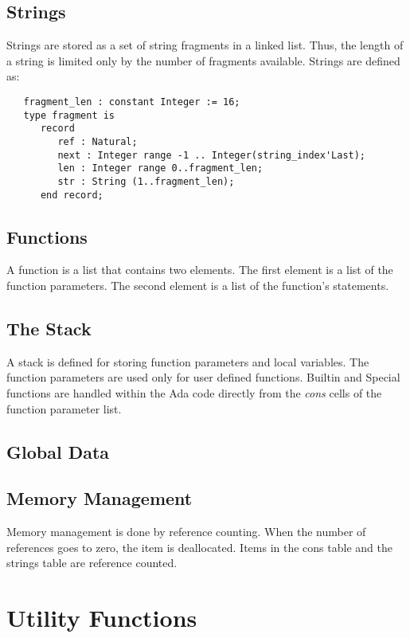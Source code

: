 \documentclass[10pt, openany]{book}
\begin{document}
\subsection{Strings}
\label{sec:strings}
Strings are stored as a set of string fragments in a linked list.  Thus, the length of a string is limited only by the number of fragments available.  Strings are defined as:
\begin{lstlisting}
   fragment_len : constant Integer := 16;
   type fragment is
      record
         ref : Natural;
         next : Integer range -1 .. Integer(string_index'Last);
         len : Integer range 0..fragment_len;
         str : String (1..fragment_len);
      end record;
\end{lstlisting}

\subsection{Functions}
\label{sec:Functions}
A function is a list that contains two elements.  The first element is a list of the function parameters.  The second element is a list of the function's statements.

\subsection{The Stack}
\label{sec:Stack}
A stack is defined for storing function parameters and local variables.  The function parameters are used only for user defined functions.  Builtin and Special functions are handled within the Ada code directly from the \emph{cons} cells of the function parameter list.

\subsection{Global Data}

\subsection{Memory Management}
Memory management is done by reference counting.  When the number of references goes to zero, the item is deallocated.  Items in the cons table and the strings table are reference counted.

\section{Utility Functions}
\end{document}
